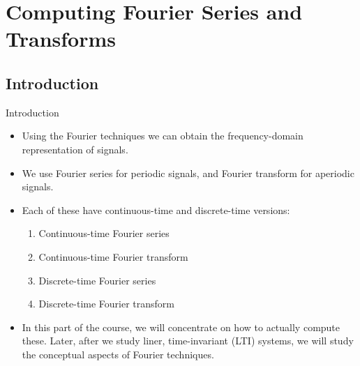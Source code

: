 \section{Computing Fourier Series and Transforms}

\subsection{Introduction}
\begin{frame}{Introduction}
    \begin{itemize}[<+->]
      \item Using the Fourier techniques we can obtain the frequency-domain representation of signals.
      \item We use Fourier series for periodic signals, and Fourier transform for aperiodic signals.
      \item Each of these have continuous-time and discrete-time versions:
        \begin{enumerate}
            \item Continuous-time Fourier series
            \item Continuous-time Fourier transform
            \item Discrete-time Fourier series
            \item Discrete-time Fourier transform
        \end{enumerate}
      \item In this part of the course, we will concentrate on how to actually compute these. Later, after we study liner, time-invariant (LTI) systems, we will study the conceptual aspects of Fourier techniques.
    \end{itemize}
\end{frame}

